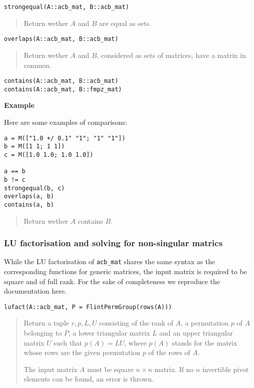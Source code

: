 \documentclass[a4paper,10pt]{article}
\newcommand{\code}{\lstinline}
\newcommand{\desc}[1]{\vspace{-3mm}\begin{quote}#1\end{quote}}
\begin{document}
{{\begin{lstlisting}
strongequal(A::acb_mat, B::acb_mat)
\end{lstlisting}

\desc{Return wether $A$ and $B$ are equal as sets.}

\begin{lstlisting}
overlaps(A::acb_mat, B::acb_mat)
\end{lstlisting}

\desc{Return wether $A$ and $B$, considered as sets of matrices,
have a matrix in common.}

\begin{lstlisting}
contains(A::acb_mat, B::acb_mat)
contains(A::acb_mat, B::fmpz_mat)
\end{lstlisting}

\textbf{Example}

Here are some examples of comparisons:

\begin{lstlisting}
a = M(["1.0 +/ 0.1" "1"; "1" "1"])
b = M([1 1; 1 1])
c = M([1.0 1.0; 1.0 1.0])

a == b
b != c
strongequal(b, c)
overlaps(a, b)
contains(a, b)
\end{lstlisting}

\desc{Return wether $A$ contains $B$.}

\subsubsection{LU factorisation and solving for non-singular matrics}

While the LU factorisation of \code{acb_mat} shares the same syntax
as the corresponding functions for generic matrices, the input matrix
is required to be square and of full rank. For the sake of completeness
we reproduce the documentation here.

\begin{lstlisting}
lufact(A::acb_mat, P = FlintPermGroup(rows(A)))
\end{lstlisting}

\desc{Return a tuple $r, p, L, U$ consisting of the rank of $A$, a permutation
$p$ of $A$ belonging to $P$, a lower triangular matrix $L$ and an upper
triangular matrix $U$ such that $p(A) = LU$, where $p(A)$ stands for the
matrix whose rows are the given permutation $p$ of the rows of $A$.

The input matrix $A$ must be square $n\times n$ matrix. If no $n$ invertible
pivot elements can be found, an error is thrown.}

}}
\end{document}
